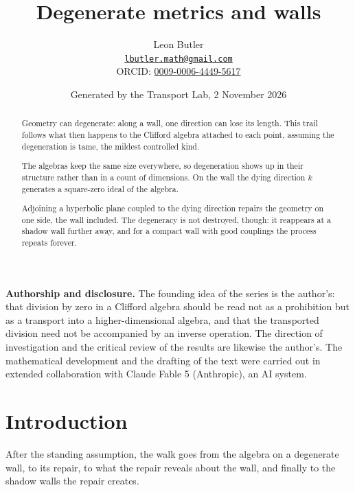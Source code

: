 \documentclass[11pt]{article}
\title{\bfseries Degenerate metrics and walls}
\author{Leon Butler\\ \normalsize\href{mailto:lbutler.math@gmail.com}{\texttt{lbutler.math@gmail.com}}\\ \normalsize ORCID: \href{https://orcid.org/0009-0006-4449-5617}{0009-0006-4449-5617}}
\date{Generated by the Transport Lab, 2 November 2026}
\theoremstyle{definition}
\theoremstyle{plain}
\begin{document}
\maketitle
\begin{abstract}
\normalsize
Geometry can degenerate: along a wall, one direction can lose its length. This trail follows what then happens to the Clifford algebra attached to each point, assuming the degeneration is tame, the mildest controlled kind.

The algebras keep the same size everywhere, so degeneration shows up in their structure rather than in a count of dimensions. On the wall the dying direction $k$ generates a square-zero ideal of the algebra.

Adjoining a hyperbolic plane coupled to the dying direction repairs the geometry on one side, the wall included. The degeneracy is not destroyed, though: it reappears at a shadow wall further away, and for a compact wall with good couplings the process repeats forever.
\end{abstract}
\newpage
\noindent \textbf{Authorship and disclosure. }The founding idea of the series is the author's: that division by zero in a Clifford algebra should be read not as a prohibition but as a transport into a higher-dimensional algebra, and that the transported division need not be accompanied by an inverse operation. The direction of investigation and the critical review of the results are likewise the author's. The mathematical development and the drafting of the text were carried out in extended collaboration with Claude Fable 5 (Anthropic), an AI system.

\noindent{}
\newpage

\section*{Introduction}
After the standing assumption, the walk goes from the algebra on a degenerate wall, to its repair, to what the repair reveals about the wall, and finally to the shadow walls the repair creates.
\end{document}
